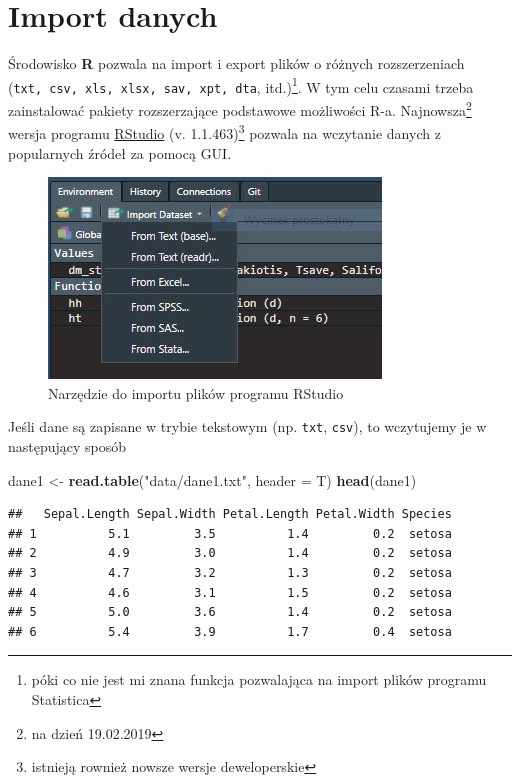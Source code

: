 \documentclass[]{book}
\newenvironment{Shaded}{\begin{snugshade}}{\end{snugshade}}
\newcommand{\DataTypeTok}[1]{\textcolor[rgb]{0.13,0.29,0.53}{#1}}
\newcommand{\KeywordTok}[1]{\textcolor[rgb]{0.13,0.29,0.53}{\textbf{#1}}}
\newcommand{\NormalTok}[1]{#1}
\newcommand{\StringTok}[1]{\textcolor[rgb]{0.31,0.60,0.02}{#1}}
\let\rmarkdownfootnote\footnote%
\def\footnote{\protect\rmarkdownfootnote}
\theoremstyle{plain}
\theoremstyle{definition}
\theoremstyle{definition}
\theoremstyle{definition}
\theoremstyle{definition}
\theoremstyle{remark}
\begin{document}
\hypertarget{roz1}{%
\chapter{Import danych}\label{roz1}}

Środowisko \textbf{R} pozwala na import i export plików o różnych rozszerzeniach (\texttt{txt,\ csv,\ xls,\ xlsx,\ sav,\ xpt,\ dta}, itd.)\footnote{póki co nie jest mi znana funkcja pozwalająca na import plików programu Statistica}. W tym celu czasami trzeba zainstalować pakiety rozszerzające podstawowe możliwości R-a. Najnowsza\footnote{na dzień 19.02.2019} wersja programu \href{https://www.rstudio.com}{RStudio} (v. 1.1.463)\footnote{istnieją rownież nowsze wersje deweloperskie} pozwala na wczytanie danych z popularnych źródeł za pomocą GUI.

\begin{figure}
\centering
\includegraphics{images/import.JPG}
\caption{\label{fig:import1}Narzędzie do importu plików programu RStudio}
\end{figure}

Jeśli dane są zapisane w trybie tekstowym (np. \texttt{txt}, \texttt{csv}), to wczytujemy je w następujący sposób

\begin{Shaded}
\begin{Highlighting}[]
\NormalTok{dane1 <-}\StringTok{ }\KeywordTok{read.table}\NormalTok{(}\StringTok{"data/dane1.txt"}\NormalTok{, }\DataTypeTok{header =}\NormalTok{ T)}
\KeywordTok{head}\NormalTok{(dane1)}
\end{Highlighting}
\end{Shaded}

\begin{verbatim}
##   Sepal.Length Sepal.Width Petal.Length Petal.Width Species
## 1          5.1         3.5          1.4         0.2  setosa
## 2          4.9         3.0          1.4         0.2  setosa
## 3          4.7         3.2          1.3         0.2  setosa
## 4          4.6         3.1          1.5         0.2  setosa
## 5          5.0         3.6          1.4         0.2  setosa
## 6          5.4         3.9          1.7         0.4  setosa
\end{verbatim}
\end{document}
